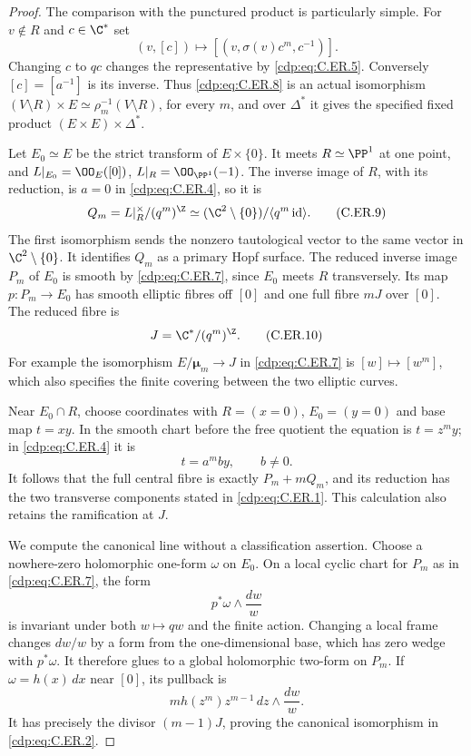 \begin{proof}
The comparison with the punctured product is particularly simple.
For $v\notin R$ and $c\in\C^*$ set
\[
       (v,[c])\longmapsto[(v,\sigma(v)c^m,c^{-1})].
                                                        \tag{C.ER.8}\label{cdp:eq:C.ER.8}
\]
Changing $c$ to $qc$ changes the representative by \eqref{cdp:eq:C.ER.5}.
Conversely $[c]=[a^{-1}]$ is its inverse. Thus \eqref{cdp:eq:C.ER.8} is an
actual isomorphism $(V\setminus R)\times E\simeq
\rho_m^{-1}(V\setminus R)$, for every $m$, and over $\Delta^*$
it gives the specified fixed product $(E\times E)\times\Delta^*$.

Let $E_0\simeq E$ be the strict transform of $E\times\{0\}$.
It meets $R\simeq\PP^1$ at one point, and
$L|_{E_0}=\OO_E([0])$, $L|_R=\OO_{\PP^1}(-1)$.
The inverse image of $R$, with its reduction, is $a=0$ in
\eqref{cdp:eq:C.ER.4}, so it is
\[
 Q_m=L|_R^\times/(q^m)^{\Z}
     \simeq(\C^2\setminus\{0\})/\langle q^m\operatorname{id}\rangle.
                                                        \tag{C.ER.9}\label{cdp:eq:C.ER.9}
\]
The first isomorphism sends the nonzero tautological vector to
the same vector in $\C^2\setminus\{0\}$. It identifies $Q_m$
as a primary Hopf surface. The reduced inverse image $P_m$ of
$E_0$ is smooth by \eqref{cdp:eq:C.ER.7}, since $E_0$ meets $R$ transversely.
Its map $p:P_m\to E_0$ has smooth elliptic fibres off $[0]$ and
one full fibre $mJ$ over $[0]$. The reduced fibre is
\[
                    J=\C^*/(q^m)^{\Z}.
                                                        \tag{C.ER.10}\label{cdp:eq:C.ER.10}
\]
For example the isomorphism $E/\boldsymbol\mu_m\to J$ in
\eqref{cdp:eq:C.ER.7} is $[w]\mapsto[w^m]$, which also specifies the finite
covering between the two elliptic curves.

Near $E_0\cap R$, choose coordinates with $R=(x=0)$,
$E_0=(y=0)$ and base map $t=xy$. In the smooth chart before
the free quotient the equation is $t=z^m y$; in \eqref{cdp:eq:C.ER.4} it is
\[
                         t=a^m b y,\qquad b\ne0.
                                                        \tag{C.ER.11}\label{cdp:eq:C.ER.11}
\]
It follows that the full central fibre is exactly $P_m+mQ_m$,
and its reduction has the two transverse components stated in
\eqref{cdp:eq:C.ER.1}. This calculation also retains the ramification at $J$.

We compute the canonical line without a classification assertion.
Choose a nowhere-zero holomorphic one-form $\omega$ on $E_0$.
On a local cyclic chart for $P_m$ as in \eqref{cdp:eq:C.ER.7}, the form
\[
                         p^*\omega\wedge\frac{dw}{w}
                                                        \tag{C.ER.12}\label{cdp:eq:C.ER.12}
\]
is invariant under both $w\mapsto qw$ and the finite action.
Changing a local frame changes $dw/w$ by a form from the
one-dimensional base, which has zero wedge with $p^*\omega$.
It therefore glues to a global holomorphic two-form on $P_m$.
If $\omega=h(x)\,dx$ near $[0]$, its pullback is
\[
 m h(z^m)z^{m-1}\,dz\wedge\frac{dw}{w}.
                                                        \tag{C.ER.13}\label{cdp:eq:C.ER.13}
\]
It has precisely the divisor $(m-1)J$, proving the canonical
isomorphism in \eqref{cdp:eq:C.ER.2}.


\end{proof}
